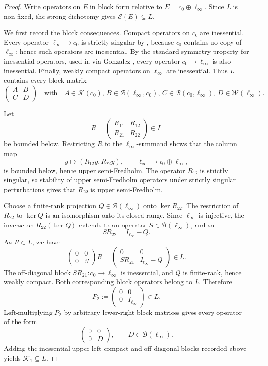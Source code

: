 \documentclass[11pt]{article}
\newcommand{\B}{\mathscr{B}}
\newcommand{\K}{\mathscr{K}}
\newcommand{\E}{\mathscr{E}}
\newcommand{\W}{\mathscr{W}}
\begin{document}
\begin{proof}
Write operators on \(E\) in block form relative to
\(E=c_0\oplus\ell_\infty\).  Since \(L\) is non-fixed, the strong dichotomy
\cite[Corollary 4.1]{DKKKL} gives \(\E(E)\subseteq L\).

We first record the block consequences.  Compact operators on \(c_0\) are
inessential.  Every operator \(\ell_\infty\to c_0\) is strictly singular by
\cite[Lemma 7.1]{DKKKL}, because \(c_0\) contains no copy of
\(\ell_\infty\); hence such operators are inessential.  By the standard
symmetry property for inessential operators, used in
\cite[proof of Theorem 7.7]{DKKKL} via Gonzalez \cite{Gonzalez}, every
operator \(c_0\to\ell_\infty\) is also inessential.  Finally, weakly compact
operators on \(\ell_\infty\) are inessential.  Thus \(L\) contains every block
matrix
\[
  \begin{pmatrix}
  A & B\\ C & D
  \end{pmatrix}
  \quad\text{with}\quad
  A\in\K(c_0),\ B\in\B(\ell_\infty,c_0),\
  C\in\B(c_0,\ell_\infty),\ D\in\W(\ell_\infty).
\]

Let
\[
  R=\begin{pmatrix} R_{11}&R_{12}\\ R_{21}&R_{22}\end{pmatrix}\in L
\]
be bounded below.  Restricting \(R\) to the \(\ell_\infty\)-summand shows
that the column map
\[
  y\mapsto (R_{12}y,R_{22}y),\qquad \ell_\infty\to c_0\oplus\ell_\infty,
\]
is bounded below, hence upper semi-Fredholm.  The operator \(R_{12}\) is
strictly singular, so stability of upper semi-Fredholm operators under
strictly singular perturbations gives that \(R_{22}\) is upper semi-Fredholm.

Choose a finite-rank projection \(Q\in\B(\ell_\infty)\) onto
\(\ker R_{22}\).  The restriction of \(R_{22}\) to \(\ker Q\) is an
isomorphism onto its closed range.  Since \(\ell_\infty\) is injective, the
inverse on \(R_{22}(\ker Q)\) extends to an operator
\(S\in\B(\ell_\infty)\), and so
\[
  SR_{22}=I_{\ell_\infty}-Q.
\]
As \(R\in L\), we have
\[
  \begin{pmatrix}0&0\\0&S\end{pmatrix}R
  =
  \begin{pmatrix}0&0\\ SR_{21}& I_{\ell_\infty}-Q\end{pmatrix}
  \in L.
\]
The off-diagonal block \(SR_{21}:c_0\to\ell_\infty\) is inessential, and
\(Q\) is finite-rank, hence weakly compact.  Both corresponding block
operators belong to \(L\).  Therefore
\[
  P_2:=\begin{pmatrix}0&0\\0&I_{\ell_\infty}\end{pmatrix}\in L.
\]
Left-multiplying \(P_2\) by arbitrary lower-right block matrices gives every
operator of the form
\[
  \begin{pmatrix}0&0\\0&D\end{pmatrix},\qquad D\in\B(\ell_\infty).
\]
Adding the inessential upper-left compact and off-diagonal blocks recorded
above yields \(\K_1\subseteq L\).
\end{proof}
\end{document}
